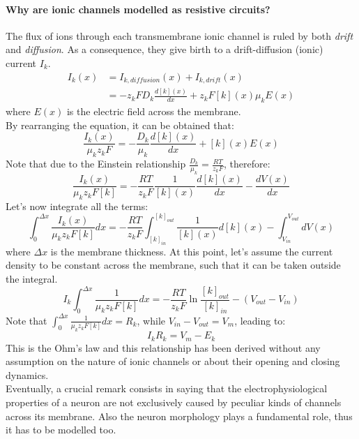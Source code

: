 \paragraph{Why are ionic channels modelled as resistive circuits?} The flux of ions through each
transmembrane ionic channel is ruled by both \textit{drift} and \textit{diffusion}. As a
consequence, they give birth to a drift-diffusion (ionic) current \(I_{k}\).
\begin{align*}
    I_{k}(x)
     & =I_{k,diffusion}(x)+I_{k,drift}(x)                      \\
     & =-z_{k}FD_{k}\frac{d[k](x)}{dx}+z_{k}F[k](x)\mu_{k}E(x)
\end{align*}
where \(E(x)\) is the electric field across the membrane.\\
By rearranging the equation, it can be obtained that:
\begin{equation*}
    \frac{I_{k}(x)}{\mu_{k}z_{k}F}=-\frac{D_{k}}{\mu_{k}}\frac{d[k](x)}{dx}+[k](x)E(x)
\end{equation*}
Note that due to the Einstein relationship \(\frac{D_{k}}{\mu_{k}}=\frac{RT}{z_{k}F}\), therefore:
\begin{equation*}
    \frac{I_{k}(x)}{\mu_{k}z_{k}F[k]}=
    -\frac{RT}{z_{k}F}\frac{1}{[k](x)}\frac{d[k](x)}{dx}-\frac{dV(x)}{dx}
\end{equation*}
Let's now integrate all the terms:
\begin{equation*}
    \int_{0}^{\Delta{x}}{\frac{I_{k}(x)}{\mu_{k}z_{k}F[k]}}dx=
    -\frac{RT}{z_{k}F}\int_{[k]_{in}}^{[k]_{out}}{\frac{1}{[k](x)}d[k](x)}
    -\int_{V_{in}}^{V_{out}}{dV(x)}
\end{equation*}
where \(\Delta{x}\) is the membrane thickness. At this point, let's assume the current density
to be constant across the membrane, such that it can be taken outside the integral.
\begin{equation*}
    I_{k}\int_{0}^{\Delta{x}}{\frac{1}{\mu_{k}z_{k}F[k]}}dx=
    -\frac{RT}{z_{k}F}\ln{\frac{[k]_{out}}{[k]_{in}}}
    -(V_{out}-V_{in})
\end{equation*}
Note that \(\int_{0}^{\Delta{x}}{\frac{1}{\mu_{k}z_{k}F[k]}}dx=R_{k}\), while
\(V_{in}-V_{out}=V_{m}\), leading to:
\begin{equation*}
    I_{k}{R_{k}}=V_{m}-E_{k}
\end{equation*}
This is the Ohm's law and this relationship has been derived without any assumption on the nature
of ionic channels or about their opening and closing dynamics.\\
Eventually, a crucial remark consists in saying that the electrophysiological properties of a
neuron are not exclusively caused by peculiar kinds of channels across its membrane. Also the
neuron morphology plays a fundamental role, thus it has to be modelled too.